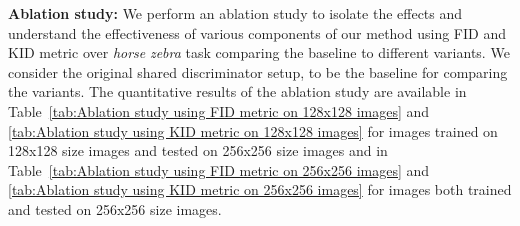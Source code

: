 \documentclass[a4paper,twoside]{article}
\begin{document}
\noindent \textbf{Ablation study:} We perform an ablation study to isolate the effects and understand the effectiveness of various components of our method using FID and KID metric over \textit{horse}  \textit{zebra} task comparing the baseline to different variants. We consider the original shared discriminator setup,  to be the baseline for comparing the variants. The quantitative results of the ablation study are available in Table~\ref{tab:Ablation study using FID metric on 128x128 images} and \ref{tab:Ablation study using KID metric on 128x128 images} for images trained on 128x128 size images and tested on 256x256 size images and in Table~\ref{tab:Ablation study using FID metric on 256x256 images} and \ref{tab:Ablation study using KID metric on 256x256 images} for images both trained and tested on 256x256 size images. 

\begin{table}[!hb] \small
\centering
\caption{Ablation study results on baseline, , ,  and  (from left to right) trained and tested on 256x256 sizes and evaluated using FID scores.}
\label{tab:Ablation study using FID metric on 256x256 images}
\end{table}
\begin{table}[!hb] \small
\centering
\caption{Ablation study results on baseline, , ,  and  (from left to right) trained and tested on 256x256 sizes and evaluated using KID scores.}
\label{tab:Ablation study using KID metric on 256x256 images}
\end{table}
\end{document}
